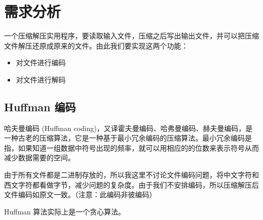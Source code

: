 \section{需求分析}

一个压缩解压实用程序，要读取输入文件，压缩之后写出输出文件，并可以把压缩文件解压还原成原来的文件。由此我们要实现这两个功能：
\begin{itemize}
\item 对文件进行编码
\item 对文件进行解码
\end{itemize}

\subsection{Huffman 编码}

哈夫曼编码 (Huffman coding)，又译霍夫曼编码、哈弗曼编码、赫夫曼编码，是一种古老的压缩算法，它是一种基于最小冗余编码的压缩算法\cite{maic}。最小冗余编码是指，如果知道一组数据中符号出现的频率，就可以用相应的的位数来表示符号从而减少数据需要的空间。

由于所有文件都是二进制存放的，所以我这里不讨论文件编码问题，将中文字符和西文字符都看做字节，减少问题的复杂度。由于我们不安排编码，所以压缩解压后文件编码如原文一致。（注意：此编码非彼编码）

Huffman 算法实际上是一个贪心算法。